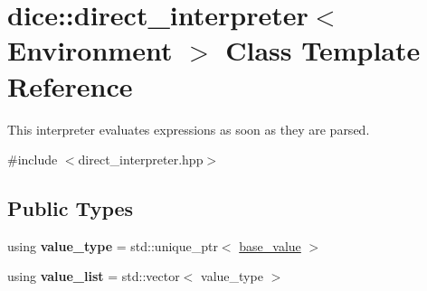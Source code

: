\hypertarget{classdice_1_1direct__interpreter}{}\section{dice\+:\+:direct\+\_\+interpreter$<$ Environment $>$ Class Template Reference}
\label{classdice_1_1direct__interpreter}


This interpreter evaluates expressions as soon as they are parsed.  




{\ttfamily \#include $<$direct\+\_\+interpreter.\+hpp$>$}

\subsection*{Public Types}
\begin{DoxyCompactItemize}
\item 
\mbox{\label{classdice_1_1direct__interpreter_acb63d47328233f2a180c0e210f7fa302}} 
using {\bfseries value\+\_\+type} = std\+::unique\+\_\+ptr$<$ \mbox{\hyperlink{classdice_1_1base__value}{base\+\_\+value}} $>$
\item 
\mbox{\label{classdice_1_1direct__interpreter_a69da4a645ada4420b22a2fa19ac1061d}} 
using {\bfseries value\+\_\+list} = std\+::vector$<$ value\+\_\+type $>$
\end{DoxyCompactItemize}
